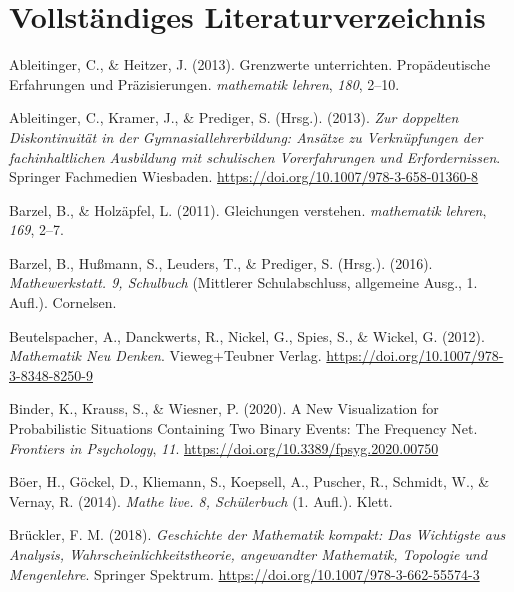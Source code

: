 \documentclass[
]{scrbook}
\newlength{\cslhangindent}
\newenvironment{CSLReferences}[2] %
 {\begin{list}{}{%
  \setlength{\itemindent}{0pt}
  \setlength{\leftmargin}{0pt}
  \setlength{\parsep}{0pt}
  \ifodd #1
   \setlength{\leftmargin}{\cslhangindent}
   \setlength{\itemindent}{-1\cslhangindent}
  \fi
  \setlength{\itemsep}{#2\baselineskip}}}
 {\end{list}}
\theoremstyle{definition}
\theoremstyle{definition}
\theoremstyle{definition}
\theoremstyle{definition}
\theoremstyle{remark}
\begin{document}
\chapter{Vollständiges Literaturverzeichnis}\label{vollstuxe4ndiges-literaturverzeichnis}

\label{refs}
\begin{CSLReferences}{1}{0}
Ableitinger, C., \& Heitzer, J. (2013). Grenzwerte unterrichten. {Propädeutische} {Erfahrungen} und {Präzisierungen}. \emph{mathematik lehren}, \emph{180}, 2--10.

Ableitinger, C., Kramer, J., \& Prediger, S. (Hrsg.). (2013). \emph{Zur doppelten {Diskontinuität} in der {Gymnasiallehrerbildung}: {Ansätze} zu {Verknüpfungen} der fachinhaltlichen {Ausbildung} mit schulischen {Vorerfahrungen} und {Erfordernissen}}. Springer Fachmedien Wiesbaden. \url{https://doi.org/10.1007/978-3-658-01360-8}

Barzel, B., \& Holzäpfel, L. (2011). Gleichungen verstehen. \emph{mathematik lehren}, \emph{169}, 2--7.

Barzel, B., Hußmann, S., Leuders, T., \& Prediger, S. (Hrsg.). (2016). \emph{Mathewerkstatt. 9, {Schulbuch}} (Mittlerer Schulabschluss, allgemeine Ausg., 1. Aufl.). Cornelsen.

Beutelspacher, A., Danckwerts, R., Nickel, G., Spies, S., \& Wickel, G. (2012). \emph{Mathematik {Neu} {Denken}}. Vieweg+Teubner Verlag. \url{https://doi.org/10.1007/978-3-8348-8250-9}

Binder, K., Krauss, S., \& Wiesner, P. (2020). A {New} {Visualization} for {Probabilistic} {Situations} {Containing} {Two} {Binary} {Events}: {The} {Frequency} {Net}. \emph{Frontiers in Psychology}, \emph{11}. \url{https://doi.org/10.3389/fpsyg.2020.00750}

Böer, H., Göckel, D., Kliemann, S., Koepsell, A., Puscher, R., Schmidt, W., \& Vernay, R. (2014). \emph{Mathe live. 8, {Schülerbuch}} (1. Aufl.). Klett.

Brückler, F. M. (2018). \emph{Geschichte der {Mathematik} kompakt: {Das} {Wichtigste} aus {Analysis}, {Wahrscheinlichkeitstheorie}, angewandter {Mathematik}, {Topologie} und {Mengenlehre}}. Springer Spektrum. \url{https://doi.org/10.1007/978-3-662-55574-3}


\end{CSLReferences}
\end{document}
